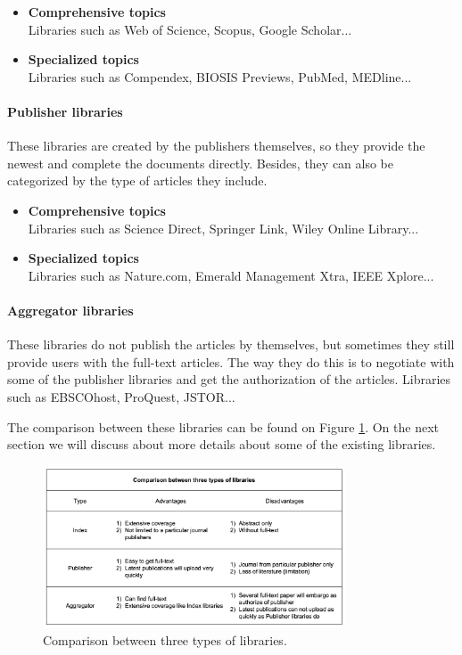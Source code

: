 	\begin{itemize}		
		\item\textbf{Comprehensive topics}\\Libraries such as Web of Science, Scopus, Google Scholar...
		\item\textbf{Specialized topics}\\Libraries such as Compendex, BIOSIS Previews, PubMed, MEDline...		
	\end{itemize}
	
\paragraph{Publisher libraries}
	These libraries are created by the publishers themselves, so they provide the newest and complete the documents directly.
	Besides, they can also be categorized by the type of articles they include.
	
	\begin{itemize}		
		\item\textbf{Comprehensive topics}\\Libraries such as Science Direct, Springer Link, Wiley Online Library...
		\item\textbf{Specialized topics}\\Libraries such as Nature.com, Emerald Management Xtra, IEEE Xplore...	
	\end{itemize}
	
\paragraph{Aggregator libraries}
	These libraries do not publish the articles by themselves, but sometimes they still provide users with the full-text articles.
	The way they do this is to negotiate with some of the publisher libraries and get the authorization of the articles.
	Libraries such as EBSCOhost, ProQuest, JSTOR...

	The comparison between these libraries can be found on Figure \ref{WBC1}.
	On the next section we will discuss about more details about some of the existing libraries.

\begin{figure}[htb]
	\begin{center}
		\includegraphics[width=0.8\textwidth]{Wolverine_Background_Chart_1}
	\end{center}
	\caption{Comparison between three types of libraries.\label{WBC1}}
\end{figure}
\newpage

